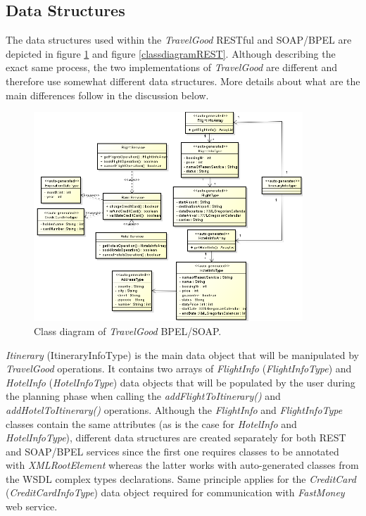 \subsection{Data Structures}
The data structures used within the \textit{TravelGood} RESTful and SOAP/BPEL are depicted in figure \ref{classdiagramBPEL} and figure \ref{classdiagramREST}. Although describing the exact same process, the two implementations of \textit{TravelGood} are different and therefore use somewhat different data structures. More details about what are the main differences follow in the discussion below. 

\begin{figure}[H]
\centering
\includegraphics[width=0.9\textwidth]{images/BPEL-SOAP}
\caption{Class diagram of \textit{TravelGood} BPEL/SOAP.}
\label{classdiagramBPEL}
\end{figure}

\textit{Itinerary} (ItineraryInfoType) is the main data object that will be manipulated by \textit{TravelGood} operations. It contains two arrays of \textit{FlightInfo} (\textit{FlightInfoType}) and \textit{HotelInfo} (\textit{HotelInfoType}) data objects that will be populated by the user during the planning phase when calling the \textit{addFlightToItinerary()} and \textit{addHotelToItinerary()} operations. Although the \textit{FlightInfo} and \textit{FlightInfoType} classes contain the same attributes (as is the case for \textit{HotelInfo} and \textit{HotelInfoType}), different data structures are created separately for both REST and SOAP/BPEL services since the first one requires classes to be annotated with \textit{\@ XMLRootElement} whereas the latter works with auto-generated classes from the WSDL complex types declarations. Same principle applies for the \textit{CreditCard} (\textit{CreditCardInfoType}) data object required for communication with \textit{FastMoney} web service.

